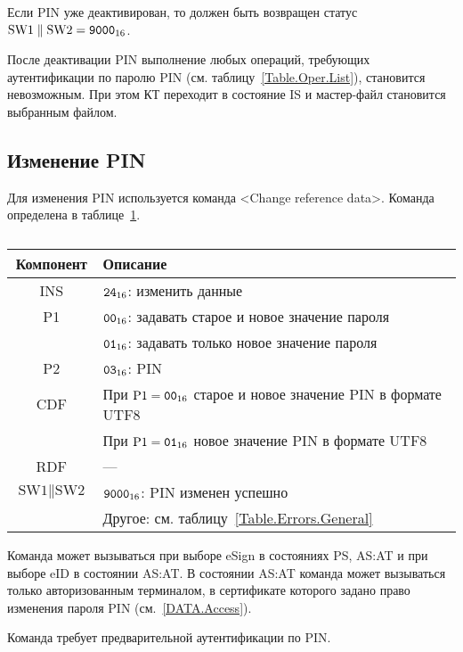 Если PIN уже деактивирован, то должен быть возвращен 
статус $\text{SW1} \parallel \text{SW2} = \texttt{9000}_{16}$.

После деактивации PIN выполнение любых операций, 
требующих аутентификации по паролю PIN (см. таблицу~\ref{Table.Oper.List}), 
становится невозможным. При этом КТ переходит в состояние IS и мастер-файл 
становится выбранным файлом. 

\subsection{Изменение PIN}
\label{Oper.Descr.ChangePIN}

Для изменения PIN используется команда <Change reference data>.
Команда определена в таблице~\ref{Table.Oper.ChangePINCmd}.

\begin{table}[hbt]
\caption{}\label{Table.Oper.ChangePINCmd}
\begin{tabular}{|c|p{14cm}|}
\hline
Компонент & 	Описание \\
\hline
\hline
INS & $\texttt{24}_{16}$: изменить данные\\
\hline
P1 & $\texttt{00}_{16}$: задавать старое и новое значение пароля \\
\cline{2-2}
   & $\texttt{01}_{16}$: задавать только новое значение пароля\\
\hline
P2 & $\texttt{03}_{16}$: PIN \\
\hline
CDF & При $\text{P1}=\texttt{00}_{16}$ старое и новое значение PIN в формате UTF8\\
\cline{2-2}
    & При $\text{P1}=\texttt{01}_{16}$ новое значение PIN в формате UTF8\\
\hline 
RDF & 	 --- \\
\hline
$\text{SW1}\parallel\text{SW2}$ & 
 $\texttt{9000}_{16}$: PIN изменен успешно \\
\cline{2-2}
  & Другое: см. таблицу~\ref{Table.Errors.General}\\
\hline
\end{tabular}
\end{table}

Команда может вызываться при выборе eSign в состояниях 
PS, AS:AT и при выборе eID в состоянии AS:AT. В состоянии AS:AT команда может 
вызываться только авторизованным терминалом, в сертификате которого задано 
право изменения пароля PIN (см.~\ref{DATA.Access}).

Команда требует предварительной аутентификации по PIN. 

